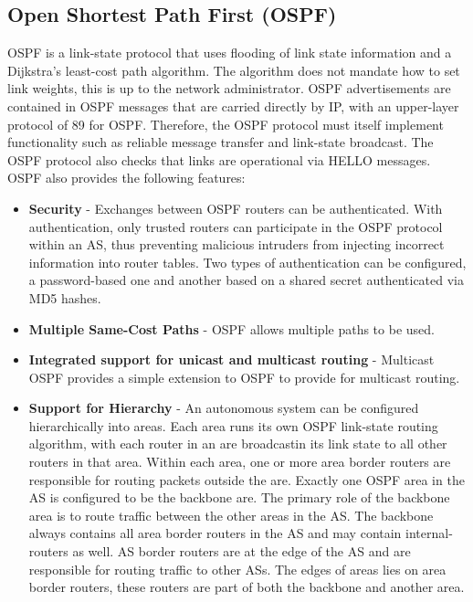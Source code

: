 \subsection{Open Shortest Path First (OSPF)}
OSPF is a link-state protocol that uses flooding of link state information and a Dijkstra's least-cost path algorithm. The algorithm does not mandate how to set link weights, this is up to the network administrator. OSPF advertisements are contained in OSPF messages that are carried directly by IP, with an upper-layer protocol of 89 for OSPF. Therefore, the OSPF protocol must itself implement functionality such as reliable message transfer and link-state broadcast. The OSPF protocol also checks that links are operational via HELLO messages. OSPF also provides the following features:
\begin{itemize}
\item \textbf{Security} - Exchanges between OSPF routers can be authenticated. With authentication, only trusted routers can participate in the OSPF protocol within an AS, thus preventing malicious intruders from injecting incorrect information into router tables. Two types of authentication can be configured, a password-based one and another based on a shared secret authenticated via MD5 hashes.
\item \textbf{Multiple Same-Cost Paths} - OSPF allows multiple paths to be used.
\item \textbf{Integrated support for unicast and multicast routing} - Multicast OSPF provides a simple extension to OSPF to provide for multicast routing.
\item \textbf{Support for Hierarchy} - An autonomous system can be configured hierarchically into areas. Each area runs its own OSPF link-state routing algorithm, with each router in an are broadcastin its link state to all other routers in that area. Within each area, one or more area border routers are responsible for routing packets outside the are. Exactly one OSPF area in the AS is configured to be the backbone are. The primary role of the backbone area is to route traffic between the other areas in the AS. The backbone always contains all area border routers in the AS and may contain internal-routers as well. AS border routers are at the edge of the AS and are responsible for routing traffic to other ASs. The edges of areas lies on area border routers, these routers are part of both the backbone and another area.
\end{itemize}

